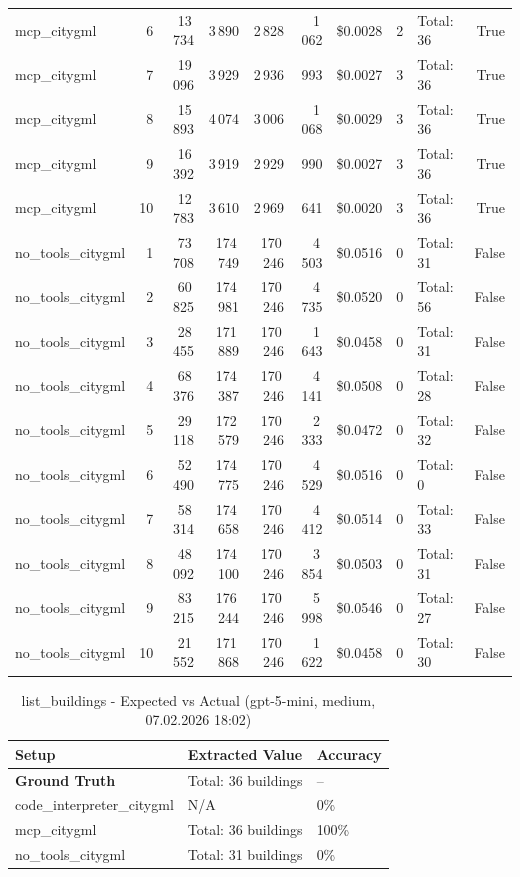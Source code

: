 \documentclass[a4paper,11pt]{article}
\begin{document}
\begin{table}[H]
{\begin{tabular}{l r r r r r r r l r}
mcp\_citygml & 6 & 13\,734 & 3\,890 & 2\,828 & 1\,062 & \$0.0028 & 2 & Total: 36 & True \\
mcp\_citygml & 7 & 19\,096 & 3\,929 & 2\,936 & 993 & \$0.0027 & 3 & Total: 36 & True \\
mcp\_citygml & 8 & 15\,893 & 4\,074 & 3\,006 & 1\,068 & \$0.0029 & 3 & Total: 36 & True \\
mcp\_citygml & 9 & 16\,392 & 3\,919 & 2\,929 & 990 & \$0.0027 & 3 & Total: 36 & True \\
mcp\_citygml & 10 & 12\,783 & 3\,610 & 2\,969 & 641 & \$0.0020 & 3 & Total: 36 & True \\
\midrule
no\_tools\_citygml & 1 & 73\,708 & 174\,749 & 170\,246 & 4\,503 & \$0.0516 & 0 & Total: 31 & False \\
no\_tools\_citygml & 2 & 60\,825 & 174\,981 & 170\,246 & 4\,735 & \$0.0520 & 0 & Total: 56 & False \\
no\_tools\_citygml & 3 & 28\,455 & 171\,889 & 170\,246 & 1\,643 & \$0.0458 & 0 & Total: 31 & False \\
no\_tools\_citygml & 4 & 68\,376 & 174\,387 & 170\,246 & 4\,141 & \$0.0508 & 0 & Total: 28 & False \\
no\_tools\_citygml & 5 & 29\,118 & 172\,579 & 170\,246 & 2\,333 & \$0.0472 & 0 & Total: 32 & False \\
no\_tools\_citygml & 6 & 52\,490 & 174\,775 & 170\,246 & 4\,529 & \$0.0516 & 0 & Total: 0 & False \\
no\_tools\_citygml & 7 & 58\,314 & 174\,658 & 170\,246 & 4\,412 & \$0.0514 & 0 & Total: 33 & False \\
no\_tools\_citygml & 8 & 48\,092 & 174\,100 & 170\,246 & 3\,854 & \$0.0503 & 0 & Total: 31 & False \\
no\_tools\_citygml & 9 & 83\,215 & 176\,244 & 170\,246 & 5\,998 & \$0.0546 & 0 & Total: 27 & False \\
no\_tools\_citygml & 10 & 21\,552 & 171\,868 & 170\,246 & 1\,622 & \$0.0458 & 0 & Total: 30 & False \\
\bottomrule
\end{tabular}}
\end{table}

\begin{table}[H]
\centering
\scriptsize
\caption{list\_buildings - Expected vs Actual (gpt-5-mini, medium, 07.02.2026 18:02)}
\begin{tabular}{l l l}
\toprule
Setup & Extracted Value & Accuracy \\
\midrule
\textbf{Ground Truth} & Total: 36 buildings & -- \\
\midrule
code\_interpreter\_citygml & N/A & 0\% \\
mcp\_citygml & Total: 36 buildings & 100\% \\
no\_tools\_citygml & Total: 31 buildings & 0\% \\
\bottomrule
\end{tabular}
\end{table}
\end{document}
